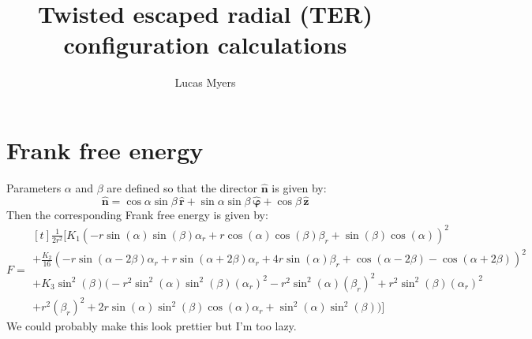 \documentclass[reqno]{article}
\newcommand{\n}{\hat{\mathbf{n}}}
\begin{document}
\title{Twisted escaped radial (TER) configuration calculations}
\author{Lucas Myers}
\maketitle

\section{Frank free energy}

Parameters $\alpha$ and $\beta$ are defined so that the director $\n$ is given by:
\begin{equation}
    \n 
    = 
    \cos\alpha \sin\beta \, \mathbf{\hat r}
    + \sin\alpha \sin\beta \, \boldsymbol{\hat \varphi}
    + \cos\beta \, \mathbf{\hat z}
\end{equation}
Then the corresponding Frank free energy is given by:
\begin{equation}
    F
    =
    \begin{multlined}[t]
    \frac{1}{2 r^2} 
        \biggl[
        K_{1} \left(- r \sin{\left(\alpha \right)} \sin{\left(\beta \right)} \alpha_r + r \cos{\left(\alpha \right)} \cos{\left(\beta \right)} \beta_r + \sin{\left(\beta \right)} \cos{\left(\alpha \right)}\right)^{2} \\
        + \frac{K_{2}}{16} \left(- r \sin{\left(\alpha - 2 \beta \right)} \alpha_r + r \sin{\left(\alpha + 2 \beta \right)} \alpha_r + 4 r \sin{\left(\alpha \right)} \beta_r + \cos{\left(\alpha - 2 \beta \right)} - \cos{\left(\alpha + 2 \beta \right)}\right)^{2} \\
        + K_{3} \sin^{2}{\left(\beta \right)} \biggl(- r^{2} \sin^{2}{\left(\alpha \right)} \sin^{2}{\left(\beta \right)} \left(\alpha_r\right)^{2} 
        - r^{2} \sin^{2}{\left(\alpha \right)} \left(\beta_r\right)^{2} 
        + r^{2} \sin^{2}{\left(\beta \right)} \left(\alpha_r\right)^{2} \\
        + r^{2} \left(\beta_r\right)^{2} 
        + 2 r \sin{\left(\alpha \right)} \sin^{2}{\left(\beta \right)} \cos{\left(\alpha \right)} \alpha_r 
        + \sin^{2}{\left(\alpha \right)} \sin^{2}{\left(\beta \right)}\biggr) 
        \biggr]
    \end{multlined}
\end{equation}
We could probably make this look prettier but I'm too lazy. 
\end{document}

